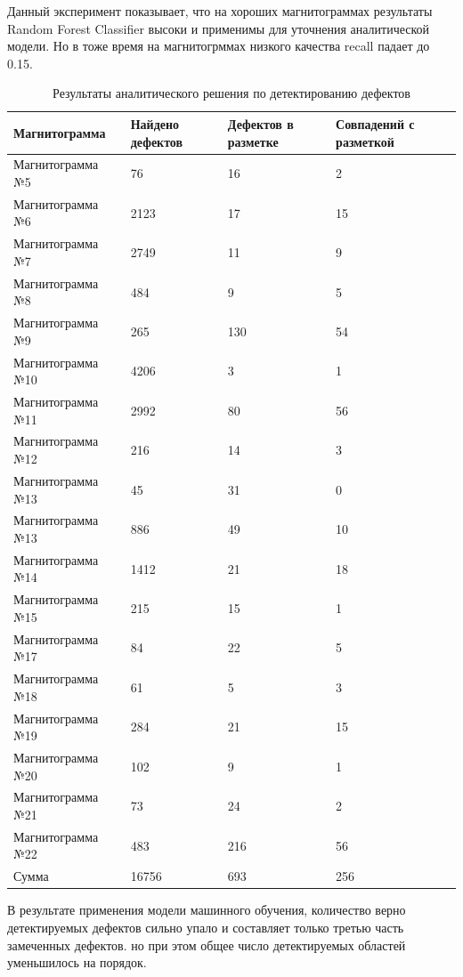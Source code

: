 \documentclass[a4paper,article,14pt]{extarticle}
\begin{document}
Данный эксперимент показывает, что на хороших магнитограммах результаты Random Forest Classifier 
высоки и применимы для уточнения аналитической модели. Но в тоже время на магнитогрммах низкого 
качества recall падает до 0.15.

\begin{center}
    \begin{longtable}{|p{5cm}|p{3cm}|p{3cm}|p{3cm}|}
        \caption{Результаты аналитического решения по детектированию дефектов}\\\hline
        Магнитограмма & Найдено дефектов & Дефектов в разметке & Совпадений с разметкой \\ \hline
        Магнитограмма №5	& 76	& 16	& 2 \\ \hline
        Магнитограмма №6	& 2123	& 17	& 15 \\ \hline
        Магнитограмма №7	& 2749	& 11  	& 9 \\ \hline
        Магнитограмма №8	& 484	& 9	    & 5 \\ \hline
        Магнитограмма №9	& 265	& 130	& 54 \\ \hline
        Магнитограмма №10	& 4206	& 3	    & 1 \\ \hline
        Магнитограмма №11	& 2992	& 80	& 56 \\ \hline
        Магнитограмма №12	& 216	& 14	& 3 \\ \hline
        Магнитограмма №13	& 45	& 31	& 0 \\ \hline
        Магнитограмма №13	& 886	& 49	& 10 \\ \hline
        Магнитограмма №14	& 1412	& 21	& 18 \\ \hline
        Магнитограмма №15	& 215	& 15	& 1 \\ \hline
        Магнитограмма №17	& 84	& 22	& 5 \\ \hline
        Магнитограмма №18	& 61	& 5	    & 3 \\ \hline
        Магнитограмма №19	& 284	& 21	& 15 \\ \hline
        Магнитограмма №20	& 102	& 9	    & 1 \\ \hline
        Магнитограмма №21	& 73	& 24	& 2 \\ \hline
        Магнитограмма №22	& 483	& 216	& 56 \\ \hline
        Сумма	& 16756	& 693	& 256 \\ \hline
    \end{longtable}
\end{center}

В результате применения модели машинного обучения, количество верно детектируемых дефектов сильно 
упало и составляет только третью часть замеченных дефектов. но при этом общее число детектируемых 
областей уменьшилось на порядок.
\end{document}
